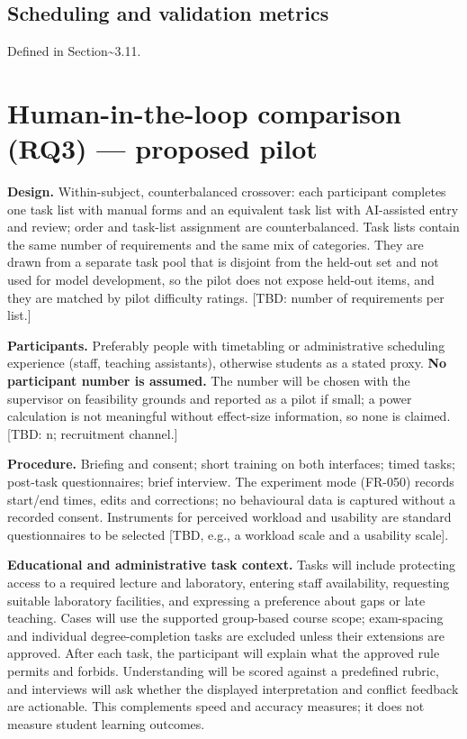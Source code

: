 \documentclass[
  11pt,a4paper,oneside]{report}
\begin{document}
\hypertarget{scheduling-and-validation-metrics}{%
\subsection{Scheduling and validation
metrics}\label{scheduling-and-validation-metrics}}

Defined in Section\textasciitilde3.11.

\hypertarget{human-in-the-loop-comparison-rq3--proposed-pilot}{%
\section{Human-in-the-loop comparison (RQ3) --- proposed
pilot}\label{human-in-the-loop-comparison-rq3--proposed-pilot}}

\textbf{Design.} Within-subject, counterbalanced crossover: each
participant completes one task list with manual forms and an equivalent
task list with AI-assisted entry and review; order and task-list
assignment are counterbalanced. Task lists contain the same number of
requirements and the same mix of categories. They are drawn from a
separate task pool that is disjoint from the held-out set and not used
for model development, so the pilot does not expose held-out items, and
they are matched by pilot difficulty ratings.
{[}TBD: number of requirements per list.{]}

\textbf{Participants.} Preferably people with timetabling or
administrative scheduling experience (staff, teaching assistants),
otherwise students as a stated proxy. \textbf{No participant number is
assumed.} The number will be chosen with the supervisor on feasibility
grounds and reported as a pilot if small; a power calculation is not
meaningful without effect-size information, so none is claimed. {[}TBD:
n; recruitment channel.{]}

\textbf{Procedure.} Briefing and consent; short training on both
interfaces; timed tasks; post-task questionnaires; brief interview. The
experiment mode (FR-050) records start/end times, edits and corrections;
no behavioural data is captured without a recorded consent. Instruments
for perceived workload and usability are standard questionnaires to be
selected {[}TBD, e.g., a workload scale and a usability scale{]}.

\textbf{Educational and administrative task context.} Tasks will include protecting access to a required lecture and laboratory, entering staff availability, requesting suitable laboratory facilities, and expressing a preference about gaps or late teaching. Cases will use the supported group-based course scope; exam-spacing and individual degree-completion tasks are excluded unless their extensions are approved. After each task, the participant will explain what the approved rule permits and forbids. Understanding will be scored against a predefined rubric, and interviews will ask whether the displayed interpretation and conflict feedback are actionable. This complements speed and accuracy measures; it does not measure student learning outcomes.
\end{document}
